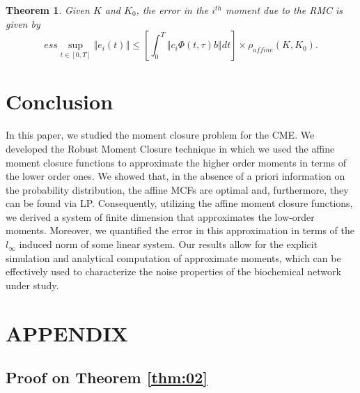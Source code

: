 \documentclass[letterpaper, 10 pt, conference]{ieeeconf}
\newtheorem{theorem}{Theorem}
\begin{document}
\begin{theorem}
\label{thm:01}Given $K$ and $K_{0}$, the error in the $i^{th}$ moment due to
the RMC is given by%
\begin{equation}
ess\sup_{t\in \left[ 0,T\right] }\left\Vert e_{i}\left( t\right) \right\Vert
\leq \left[ \int_{0}^{T}\left\Vert c_{i}\Phi \left( t,\tau \right)
b\right\Vert dt\right] \times \rho _{affine}\left( K,K_{0}\right) .
\label{eq:10}
\end{equation}
\end{theorem}


\section{Conclusion}

In this paper, we studied the moment closure problem for the CME. We
developed the Robust Moment Closure technique in which we used the affine
moment closure functions to approximate the higher order moments in terms of
the lower order ones. We showed that, in the absence of a priori information
on the probability distribution, the affine MCFs are optimal and,
furthermore, they can be found via LP. Consequently, utilizing the affine
moment closure functions, we derived a system of finite dimension that
approximates the low-order moments. Moreover, we quantified the error in
this approximation in terms of the $l_{\infty }$ induced norm of some linear
system. Our results allow for the explicit simulation and analytical
computation of approximate moments, which can be effectively used to
characterize the noise properties of the biochemical network under study.

\section*{APPENDIX}

\subsection*{Proof on Theorem \protect\ref{thm:02}}
\end{document}

